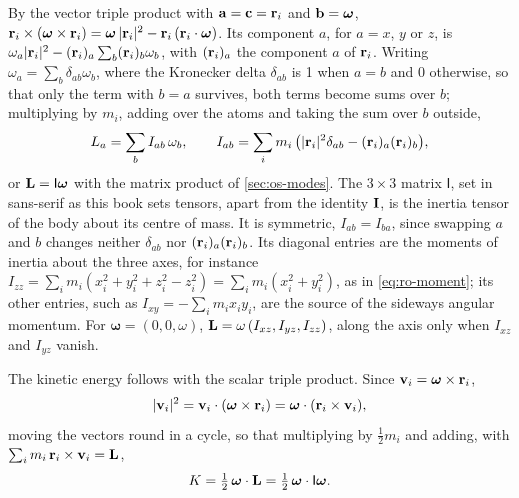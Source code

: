 By the vector triple product with $\bm{\mathrm{a}} = \bm{\mathrm{c}} = \bm{\mathrm{r}}_i$ and $\bm{\mathrm{b}}
= \boldsymbol{\omega}$, $\bm{\mathrm{r}}_i\times(\boldsymbol{\omega}\times\bm{\mathrm{r}}_i)
= \boldsymbol{\omega}\,\lvert\bm{\mathrm{r}}_i\rvert^2 - \bm{\mathrm{r}}_i\,(\bm{\mathrm{r}}_i\cdot
\boldsymbol{\omega})$. Its component $a$, for $a = x$, $y$ or $z$, is
$\omega_a\lvert\bm{\mathrm{r}}_i\rvert^2 - (\bm{\mathrm{r}}_i)_a\sum_b(\bm{\mathrm{r}}_i)_b\omega_b$,
with $(\bm{\mathrm{r}}_i)_a$ the component $a$ of $\bm{\mathrm{r}}_i$. Writing $\omega_a = \sum_b\delta_{ab}
\omega_b$, where the Kronecker delta $\delta_{ab}$ is 1 when $a = b$ and 0
otherwise, so that only the term with $b = a$ survives, both terms become
sums over $b$; multiplying by $m_i$, adding over the atoms and taking the
sum over $b$ outside,
\begin{equation}
   L_a = \sum_b I_{ab}\,\omega_b , \qquad
   I_{ab} = \sum_i m_i\,\bigl(\lvert\bm{\mathrm{r}}_i\rvert^2\delta_{ab}
   - (\bm{\mathrm{r}}_i)_a(\bm{\mathrm{r}}_i)_b\bigr) ,
   \label{eq:ro-tensor}
\end{equation}
or $\bm{\mathrm{L}} = \mathsf{I}\boldsymbol{\omega}$ with the matrix product of
\cref{sec:os-modes}. The $3\times3$ matrix $\mathsf{I}$, set in sans-serif
as this book sets tensors, apart from the identity $\bm{\mathrm{I}}$, is the
inertia tensor of the body about its centre of mass. It is symmetric,
$I_{ab} = I_{ba}$, since swapping $a$ and $b$ changes neither
$\delta_{ab}$ nor $(\bm{\mathrm{r}}_i)_a(\bm{\mathrm{r}}_i)_b$. Its diagonal entries are the moments of inertia about the three
axes, for instance $I_{zz} = \sum_i m_i(x_i^2 + y_i^2 + z_i^2 - z_i^2) =
\sum_i m_i(x_i^2 + y_i^2)$, as in \cref{eq:ro-moment}; its other entries,
such as $I_{xy} = -\sum_i m_ix_iy_i$, are the source of the sideways
angular momentum. For $\boldsymbol{\omega} = (0, 0, \omega)$, $\bm{\mathrm{L}} =
\omega\,(I_{xz}, I_{yz}, I_{zz})$, along the axis only when $I_{xz}$ and
$I_{yz}$ vanish.

The kinetic energy follows with the scalar triple product. Since $\bm{\mathrm{v}}_i
= \boldsymbol{\omega}\times\bm{\mathrm{r}}_i$,
\begin{equation*}
   \lvert\bm{\mathrm{v}}_i\rvert^2 = \bm{\mathrm{v}}_i\cdot(\boldsymbol{\omega}\times\bm{\mathrm{r}}_i)
   = \boldsymbol{\omega}\cdot(\bm{\mathrm{r}}_i\times\bm{\mathrm{v}}_i) ,
\end{equation*}
moving the vectors round in a cycle, so that multiplying by $\frac12 m_i$
and adding, with $\sum_i m_i\,\bm{\mathrm{r}}_i\times\bm{\mathrm{v}}_i = \bm{\mathrm{L}}$,
\begin{equation}
   K = \tfrac12\,\boldsymbol{\omega}\cdot\bm{\mathrm{L}}
   = \tfrac12\,\boldsymbol{\omega}\cdot\mathsf{I}\boldsymbol{\omega} .
   \label{eq:ro-kinetic}
\end{equation}


